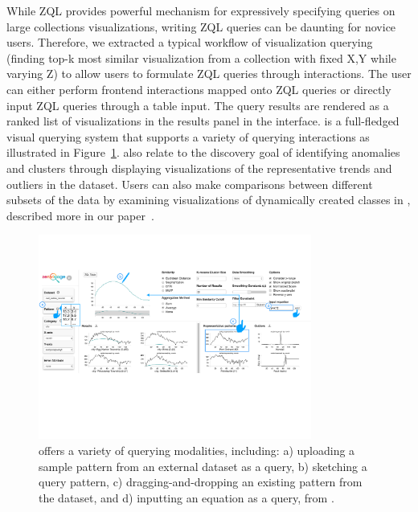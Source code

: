 \par While ZQL provides powerful mechanism for expressively specifying queries on large collections visualizations, writing ZQL queries can be daunting for novice users. Therefore, we extracted a typical workflow of visualization querying (finding top-k most similar visualization from a collection with fixed X,Y while varying Z) to allow users to formulate ZQL queries through interactions. The user can either perform frontend interactions mapped onto ZQL queries or directly input ZQL queries through a table input. The query results are rendered as a ranked list of visualizations in the results panel in the interface. \zv is a full-fledged visual querying system that supports a variety of querying interactions as illustrated in Figure~\ref{fig:modalities}. \zv also relate to the discovery goal of identifying anomalies and clusters through displaying visualizations of the representative trends and outliers in the dataset. Users can also make comparisons between different subsets of the data by examining visualizations of dynamically created classes in \zv, described more in our paper~\cite{Lee2017}.%

\begin{figure}[h!]
\centering
\includegraphics[width=0.8\textwidth]{figures/modalities.pdf}
\caption{\zv offers a variety of querying modalities, including: a) uploading a sample pattern from an external dataset as a query, b) sketching a query pattern, c) dragging-and-dropping an existing pattern from the dataset, and d) inputting an equation as a query, from \cite{Lee2017}.}
\label{fig:modalities}
\end{figure}
